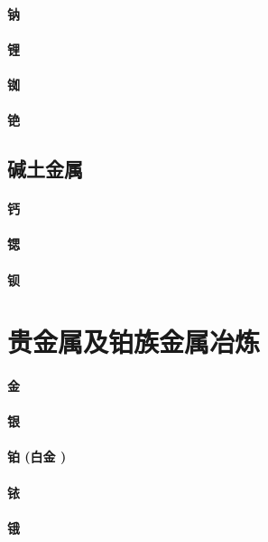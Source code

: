\documentclass[UTF8]{../../ApplicationUniverse}
\begin{document}
    \subsubsection{钠}
    \subsubsection{锂}
    \subsubsection{铷}
    \subsubsection{铯}
\section{碱土金属}
    \subsubsection{钙}
    \subsubsection{锶}
    \subsubsection{钡}






\chapter{贵金属及铂族金属冶炼}
\subsubsection{金}
\subsubsection{银}
\subsubsection{铂 (白金 )}
\subsubsection{铱}
\subsubsection{锇}
\end{document}
